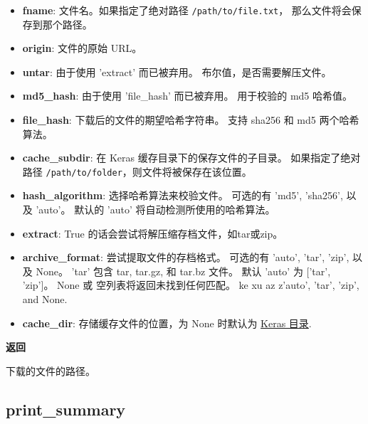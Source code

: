 \begin{itemize}
\tightlist
\item
  \textbf{fname}: 文件名。如果指定了绝对路径
  \texttt{/path/to/file.txt}， 那么文件将会保存到那个路径。
\item
  \textbf{origin}: 文件的原始 URL。
\item
  \textbf{untar}: 由于使用 'extract' 而已被弃用。
  布尔值，是否需要解压文件。
\item
  \textbf{md5\_hash}: 由于使用 'file\_hash' 而已被弃用。 用于校验的 md5
  哈希值。
\item
  \textbf{file\_hash}: 下载后的文件的期望哈希字符串。 支持 sha256 和 md5
  两个哈希算法。
\item
  \textbf{cache\_subdir}: 在 Keras 缓存目录下的保存文件的子目录。
  如果指定了绝对路径 \texttt{/path/to/folder}，则文件将被保存在该位置。
\item
  \textbf{hash\_algorithm}: 选择哈希算法来校验文件。 可选的有 'md5',
  'sha256', 以及 'auto'。 默认的 'auto' 将自动检测所使用的哈希算法。
\item
  \textbf{extract}: True 的话会尝试将解压缩存档文件，如tar或zip。
\item
  \textbf{archive\_format}: 尝试提取文件的存档格式。 可选的有 'auto',
  'tar', 'zip', 以及 None。 'tar' 包含 tar, tar.gz, 和 tar.bz 文件。
  默认 'auto' 为 {[}'tar', 'zip'{]}。 None 或
  空列表将返回未找到任何匹配。 ke xu az z'auto', 'tar', 'zip', and None.
\item
  \textbf{cache\_dir}: 存储缓存文件的位置，为 None 时默认为
  \hyperref[where-is-the-keras-configuration-file-stored]{Keras
  目录}.
\end{itemize}

\textbf{返回}

下载的文件的路径。



\subsection{print\_summary}\label{print-summary}

\begin{Shaded}
\begin{Highlighting}[]
\OperatorTok{=}\OperatorTok{=}\OperatorTok{=}\NormalTok{)}
\end{Highlighting}
\end{Shaded}

